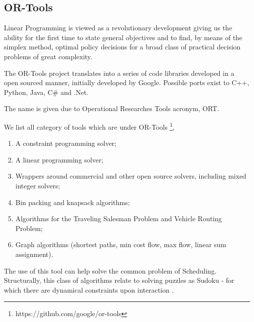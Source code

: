 \documentclass[
12pt,				%
openright,			%
oneside,			%
a4paper,			%
brazil,				%
english,			%
]{abntex2}
\begin{document}


\clearpage
\subsection{OR-Tools}
\label{sec:ortools}

\begin{citacao}
Linear Programming is viewed as a revolutionary development giving us
the ability for the first time to state general objectives and to
find, by means of the simplex method, optimal policy decisions for a
broad class of practical decision problems of great complexity. \cite{dantzig1983}
\end{citacao}


The OR-Tools project translates into a series of code libraries
developed in a open sourced manner, initially developed by
Google. Possible ports exist to C++, Python, Java, C\# and .Net.  

The name is given due to Operational Researches Tools acronym, ORT.

We list all category of tools which are under OR-Tools \footnote{https://github.com/google/or-tools},

\begin{enumerate}
\item A constraint programming solver;
\item A linear programming solver;
\item  Wrappers around commercial and other open source solvers, including mixed integer solvers;
\item  Bin packing and knapsack algorithms;
\item  Algorithms for the Traveling Salesman Problem and Vehicle Routing Problem;
\item  Graph algorithms (shortest paths, min cost flow, max flow, linear sum assignment).
\end{enumerate}


The use of this tool can help solve the common problem of
Scheduling. Structurally, this class of algorithms relate to solving
puzzles as Sudoku - for which there are dynamical constraints upon
interaction \cite{simonis2005sudoku}. 
\end{document}
